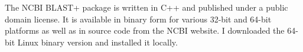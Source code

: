 The NCBI BLAST+ package is written in C++ and published under a public domain
license. It is available in binary form for various 32-bit and 64-bit platforms
as well as in source code from the NCBI website. I downloaded the 64-bit Linux
binary version and installed it locally.
